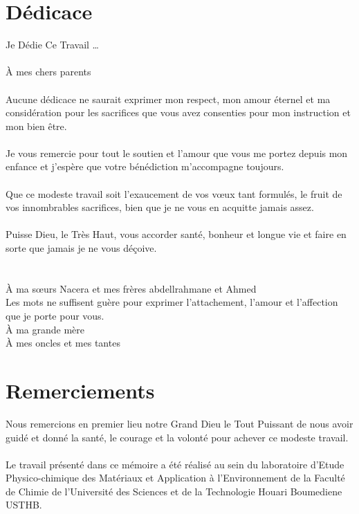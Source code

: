 \documentclass{report}
\begin{document}
\chapter*{Dédicace}
Je Dédie Ce Travail    \dots \\ \\

À mes chers parents \\ \\

Aucune dédicace ne saurait exprimer mon respect, mon amour éternel et ma considération pour les sacrifices que vous avez consenties pour mon instruction et mon bien être.\\ \\
Je vous remercie pour tout le soutien et l’amour que vous me portez depuis mon enfance et j’espère que votre bénédiction m’accompagne toujours.\\ \\
Que ce modeste travail soit l’exaucement de vos vœux tant formulés, le fruit de vos innombrables sacrifices, bien que je ne vous en acquitte jamais assez.\\ \\
Puisse Dieu, le Très Haut, vous accorder santé, bonheur et longue vie et faire en sorte que jamais je ne vous déçoive.\\ \\ \\


À ma sœurs Nacera et mes  frères abdellrahmane et Ahmed \\

Les mots ne suffisent guère pour exprimer l’attachement, l’amour et l’affection que je porte pour vous.\\

À ma grande mère\\

À mes oncles et mes tantes\\

\chapter*{Remerciements}
Nous remercions en premier lieu notre Grand Dieu le Tout Puissant de nous avoir guidé et donné la santé, le courage et la volonté pour achever ce modeste travail.\\ \\

Le travail présenté dans ce mémoire a été réalisé au sein du laboratoire d’Etude Physico-chimique des Matériaux et Application à l’Environnement de la Faculté de Chimie de l’Université des Sciences et de la Technologie Houari Boumediene USTHB.\\
\end{document}
